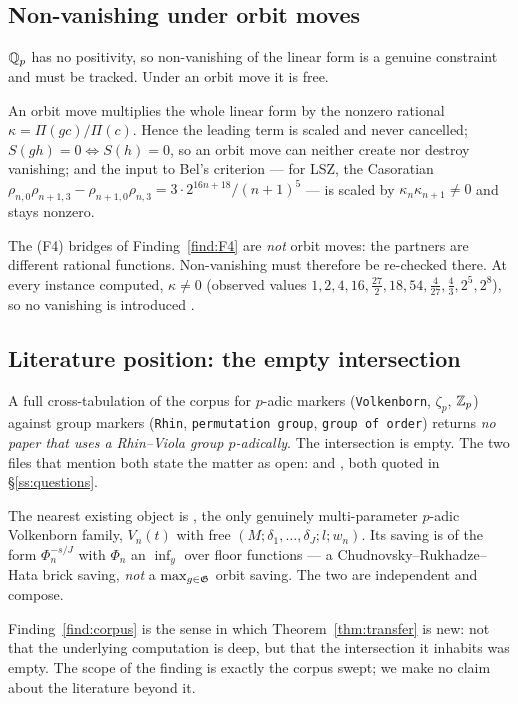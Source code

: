 \subsection{Non-vanishing under orbit moves}\label{ss:nonvan}

$\mathbb{Q}_p$ has no positivity, so non-vanishing of the linear form is a genuine constraint and
must be tracked. Under an orbit move it is free.

\begin{proposition}\label{prop:orbitnonvan}
\PROVED{} An orbit move multiplies the whole linear form by the nonzero rational
$\kappa=\Pi(gc)/\Pi(c)$. Hence the leading term is scaled and never cancelled;
$S(gh)=0\iff S(h)=0$, so an orbit move can neither create nor destroy vanishing; and the
input to Bel's criterion --- for LSZ, the Casoratian
$\rho_{n,0}\rho_{n+1,3}-\rho_{n+1,0}\rho_{n,3}=3\cdot2^{16n+18}/(n+1)^5$
\cite[Lemma 15(b)]{LSZ2025} --- is scaled by $\kappa_n\kappa_{n+1}\ne0$ and stays nonzero.
\end{proposition}

\begin{remark}\label{rem:bridgenonvan}
The (F4) bridges of Finding~\ref{find:F4} are \emph{not} orbit moves: the partners are
different rational functions. Non-vanishing must therefore be re-checked there. At every
instance computed, $\kappa\ne0$ (observed values
$1,2,4,16,\tfrac{27}2,18,54,\tfrac4{27},\tfrac43,2^5,2^8$), so no vanishing is introduced
.
\end{remark}

\subsection{Literature position: the empty intersection}\label{ss:corpus}

\begin{finding}\label{find:corpus}
 A full cross-tabulation of the corpus for
$p$-adic markers (\texttt{Volkenborn}, $\zeta_p$, $\mathbb{Z}_p$) against group markers
(\texttt{Rhin}, \texttt{permutation group}, \texttt{group of order}) returns \emph{no paper
that uses a Rhin--Viola group $p$-adically}. The intersection is empty. The two files that
mention both state the matter as open: \cite[Final remarks]{LSZ2025} and
\cite[Rem.~47]{Brown2026}, both quoted in \S\ref{ss:questions}.
\end{finding}

The nearest existing object is \cite[\S\S7--8]{Lai2024}, the only genuinely multi-parameter
$p$-adic Volkenborn family, $V_n(t)$ with free
$(M;\delta_1,\dots,\delta_J;l;w_n)$. Its saving is of the form $\Phi_n^{-s/J}$ with
$\Phi_n$ an $\inf_y$ over floor functions --- a Chudnovsky--Rukhadze--Hata brick saving,
\emph{not} a $\max_{g\in\mathfrak{G}}$ orbit saving. The two are independent and compose.

Finding~\ref{find:corpus} is the sense in which Theorem~\ref{thm:transfer} is new: not that
the underlying computation is deep, but that the intersection it inhabits was empty. The
scope of the finding is exactly the corpus swept; we make no claim about the literature
beyond it.
